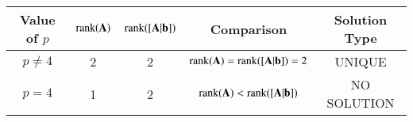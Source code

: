\begin{tabular}{|c|c|c|c|c|}
    \hline
    Value of $p$ & $\text{rank}(\mathbf{A})$ & $\text{rank}([\mathbf{A}|\mathbf{b}])$ & Comparison & Solution Type \\
    \hline
    $p \neq 4$ & 2 & 2 & $\text{rank}(\mathbf{A}) = \text{rank}([\mathbf{A}|\mathbf{b}]) = 2$ & 
    UNIQUE \\
    $p = 4$ & 1 & 2 & $\text{rank}(\mathbf{A}) < \text{rank}([\mathbf{A}|\mathbf{b}])$ & NO SOLUTION \\
    \hline
\end{tabular}